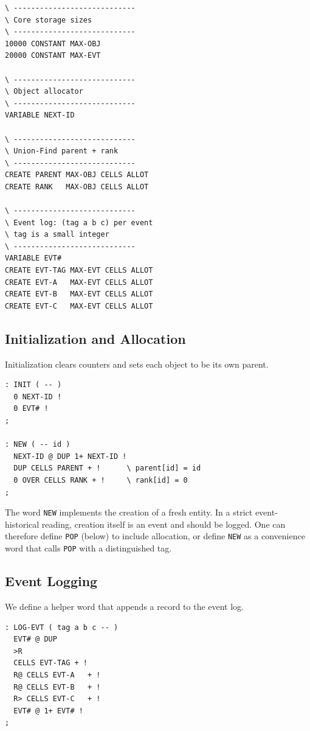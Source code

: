\documentclass[11pt]{article}
\begin{document}
\begin{verbatim}
\ ----------------------------
\ Core storage sizes
\ ----------------------------
10000 CONSTANT MAX-OBJ
20000 CONSTANT MAX-EVT

\ ----------------------------
\ Object allocator
\ ----------------------------
VARIABLE NEXT-ID

\ ----------------------------
\ Union-Find parent + rank
\ ----------------------------
CREATE PARENT MAX-OBJ CELLS ALLOT
CREATE RANK   MAX-OBJ CELLS ALLOT

\ ----------------------------
\ Event log: (tag a b c) per event
\ tag is a small integer
\ ----------------------------
VARIABLE EVT#
CREATE EVT-TAG MAX-EVT CELLS ALLOT
CREATE EVT-A   MAX-EVT CELLS ALLOT
CREATE EVT-B   MAX-EVT CELLS ALLOT
CREATE EVT-C   MAX-EVT CELLS ALLOT
\end{verbatim}

\subsection{Initialization and Allocation}

Initialization clears counters and sets each object to be its own parent.

\begin{verbatim}
: INIT ( -- )
  0 NEXT-ID !
  0 EVT# !
;

: NEW ( -- id )
  NEXT-ID @ DUP 1+ NEXT-ID !
  DUP CELLS PARENT + !      \ parent[id] = id
  0 OVER CELLS RANK + !     \ rank[id] = 0
;
\end{verbatim}

The word \texttt{NEW} implements the creation of a fresh entity. In a strict
event-historical reading, creation itself is an event and should be logged. One
can therefore define \texttt{POP} (below) to include allocation, or define
\texttt{NEW} as a convenience word that calls \texttt{POP} with a distinguished
tag.

\subsection{Event Logging}

We define a helper word that appends a record to the event log.

\begin{verbatim}
: LOG-EVT ( tag a b c -- )
  EVT# @ DUP
  >R
  CELLS EVT-TAG + !
  R@ CELLS EVT-A   + !
  R@ CELLS EVT-B   + !
  R> CELLS EVT-C   + !
  EVT# @ 1+ EVT# !
;
\end{verbatim}
\end{document}
